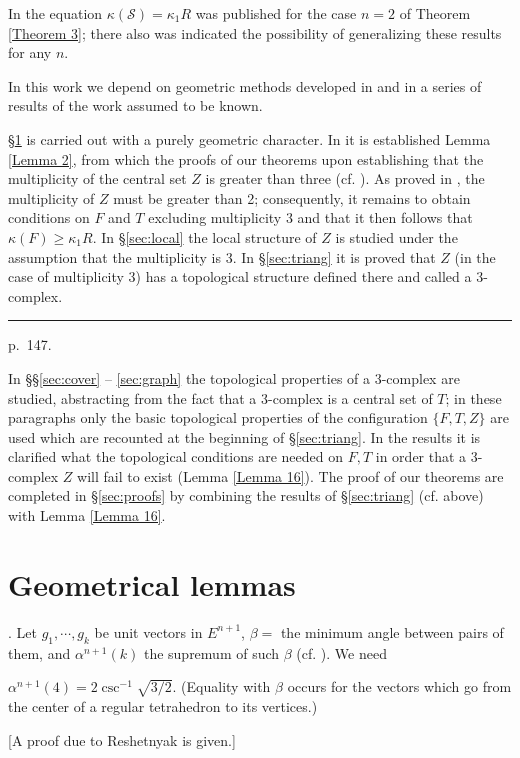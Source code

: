 \documentclass{amsart}
\theoremstyle{plain}
\theoremstyle{definition}
\begin{document}
 In \cite{LF} the equation $\kappa(\mathcal{S}) = \kappa_1R$ was published
for the case $n=2$ of Theorem \ref{Theorem 3}; there also was indicated the
possibility of generalizing these results for any $n$.

In this work we depend on geometric methods developed in
\cite{L3} and in a series of results of the work \cite{L3} assumed
to be known.

\S \ref{sec:geom} is carried out with a purely geometric character. In it is
established Lemma \ref{Lemma 2}, from which the proofs of our theorems
upon establishing that the multiplicity of the central set $Z$
is greater than three (cf. \cite[p. 225 (3:5)]{L3}). As proved in
\cite{L3}, the multiplicity of $Z$ must be greater than 2;
consequently, it remains to obtain conditions on $F$ and $T$
excluding multiplicity 3 and that it then follows that $\kappa(F)
\ge \kappa_1R$. In \S \ref{sec:local} the local structure of $Z$ is studied under
the assumption that the multiplicity is 3. In \S \ref{sec:triang} it is proved
that $Z$ (in the case of multiplicity 3) has a topological
structure defined there and called a 3-complex.

\medskip
\hrule\smallskip
\noindent p.~147.
\medskip

In \S\S \ref{sec:cover} -- \ref{sec:graph} the topological properties of a 3-complex are
studied, abstracting from the fact that a 3-complex is a
central set of $T$; in these paragraphs only the basic topological
properties of the configuration $\{ F, T, Z \}$ are used which
are recounted at the beginning of \S \ref{sec:triang}. In the results it is
clarified what the topological conditions are needed on $F,T$
in order that a 3-complex $Z$ will fail to exist (Lemma \ref{Lemma 16}).
The proof of our theorems are completed in \S \ref{sec:proofs} by combining
the results of \S \ref{sec:triang} (cf. above) with Lemma \ref{Lemma 16}.

\section{Geometrical lemmas}\label{sec:geom}
. Let $g_1, \cdots, g_k$ be unit vectors in $E^{n+1}$,
$\beta = $ the minimum angle between pairs of them, and
$\alpha^{n+1}(k)$ the supremum of such $\beta$ (cf. \cite[p. 226]{L3}). We need
\begin{lem}\label{Lemma 1} $\alpha^{n+1}(4) = 2 \csc^{-1}\sqrt{3/2}$.
(Equality with $\beta$ occurs for the vectors which go from the
center of a regular tetrahedron to its vertices.)
\end{lem}
[A proof due to Reshetnyak is given.]
\end{document}
